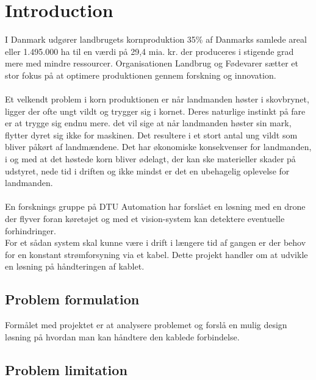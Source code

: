 \chapter{Introduction}

I Danmark udgører landbrugets kornproduktion 35\% af Danmarks samlede areal eller 1.495.000 ha til en værdi på 29,4 mia. kr. der produceres i stigende grad mere med mindre ressourcer. Organisationen Landbrug og Fødevarer sætter et stor fokus på at optimere produktionen gennem forskning og innovation.
\\
\\
Et velkendt problem i korn produktionen er når landmanden høster i skovbrynet, ligger der ofte ungt vildt og trygger sig i kornet. Deres naturlige instinkt på fare er at trygge sig endnu mere. det vil sige at når landmanden høster sin mark, flytter dyret sig ikke for maskinen. Det resultere i et stort antal ung vildt som bliver påkørt af landmændene. Det har økonomiske konsekvenser for landmanden, i og med at det høstede korn bliver ødelagt, der kan ske materieller skader på udstyret, nede tid i driften og ikke mindst er det en ubehagelig oplevelse for landmanden.
\\
\\
En forsknings gruppe på DTU Automation har forslået en løsning med en drone der flyver foran køretøjet og med et vision-system kan detektere eventuelle forhindringer.
\\
For et sådan system skal kunne være i drift i længere tid af gangen er der behov for en konstant strømforsyning via et kabel. Dette projekt handler om at udvikle en løsning på håndteringen af kablet.


\section{Problem formulation}
Formålet med projektet er at analysere problemet og forslå en mulig design løsning på hvordan man kan håndtere den kablede forbindelse. 

\section{Problem limitation}





